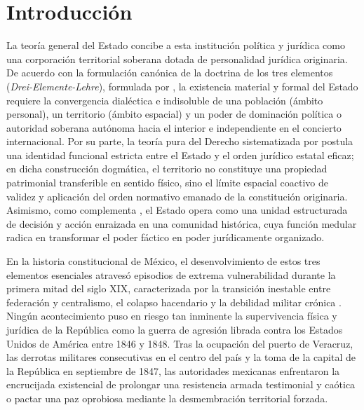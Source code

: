 \documentclass[12pt,spanish,letterpaper,oneside]{article}
\begin{document}
\section{Introducci\'on}

La teor\'ia general del Estado concibe a esta instituci\'on pol\'itica y jur\'idica como una corporaci\'on territorial soberana dotada de personalidad jur\'idica originaria. De acuerdo con la formulaci\'on can\'onica de la doctrina de los tres elementos (\emph{Drei-Elemente-Lehre}), formulada por \citet[pp.~395--412]{jellinek2018teoria}, la existencia material y formal del Estado requiere la convergencia dial\'ectica e indisoluble de una poblaci\'on (\'ambito personal), un territorio (\'ambito espacial) y un poder de dominaci\'on pol\'itica o autoridad soberana aut\'onoma hacia el interior e independiente en el concierto internacional. Por su parte, la teor\'ia pura del Derecho sistematizada por \citet[pp.~213--228]{kelsen2020teoria} postula una identidad funcional estricta entre el Estado y el orden jur\'idico estatal eficaz; en dicha construcci\'on dogm\'atica, el territorio no constituye una propiedad patrimonial transferible en sentido f\'isico, sino el l\'imite espacial coactivo de validez y aplicaci\'on del orden normativo emanado de la constituci\'on originaria. Asimismo, como complementa \citet[pp.~189--205]{heller2012teoria}, el Estado opera como una unidad estructurada de decisi\'on y acci\'on enraizada en una comunidad hist\'orica, cuya funci\'on medular radica en transformar el poder f\'actico en poder jur\'idicamente organizado.

En la historia constitucional de M\'exico, el desenvolvimiento de estos tres elementos esenciales atraves\'o episodios de extrema vulnerabilidad durante la primera mitad del siglo XIX, caracterizada por la transici\'on inestable entre federaci\'on y centralismo, el colapso hacendario y la debilidad militar cr\'onica \citep[pp.~85--104]{tenaRamirez1999,andrade2003}. Ning\'un acontecimiento puso en riesgo tan inminente la supervivencia f\'isica y jur\'idica de la Rep\'ublica como la guerra de agresi\'on librada contra los Estados Unidos de Am\'erica entre 1846 y 1848. Tras la ocupaci\'on del puerto de Veracruz, las derrotas militares consecutivas en el centro del pa\'is y la toma de la capital de la Rep\'ublica en septiembre de 1847, las autoridades mexicanas enfrentaron la encrucijada existencial de prolongar una resistencia armada testimonial y ca\'otica o pactar una paz oprobiosa mediante la desmembraci\'on territorial forzada.
\end{document}
